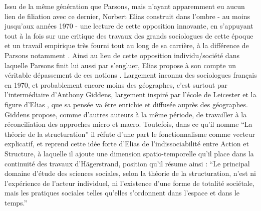 
Issu de la même génération que Parsons, mais n'ayant apparemment eu aucun lien de filiation avec ce dernier, Norbert Elias construit dans l'ombre - au moins jusqu'aux années 1970 - une lecture de cette opposition innovante, en s'appuyant tout à la fois sur une critique des travaux des grands sociologues de cette époque et un travail empirique très fourni tout au long de sa carrière, à la différence de Parsons notamment \autocite{Mennell1989}. Ainsi au lieu de cette opposition individu/société dans laquelle Parsons finit lui aussi par s'engluer, Elias propose à son compte un véritable dépassement de ces notions \autocite[94-101]{Heinich2002}. Largement inconnu des sociologues français en 1970, et probablement encore moins des géographes, c'est surtout par l'intermédiaire d'Anthony Giddens, largement inspiré par l'école de Leicester et la figure d'Elias \autocite[172-178]{Dunning2013}, que sa pensée va être enrichie et diffusée auprès des géographes. Giddens propose, comme d'autres auteurs à la même période, de travailler à la réconciliation des approches micro et macro. Toutefois, dans ce qu'il nomme \enquote{La théorie de la structuration} il réfute d'une part le fonctionnalisme comme vecteur explicatif, et reprend cette idée forte d'Elias de l'indissociabilité entre Action et Structure, à laquelle il ajoute une dimension spatio-temporelle qu'il place dans la continuité des travaux d'Hägerstrand, position qu'il résume ainsi : \enquote{Le principal domaine d’étude des sciences sociales, selon la théorie de la structuration, n’est ni l’expérience de l’acteur individuel, ni l’existence d’une forme de totalité sociétale, mais les pratiques sociales telles qu’elles s’ordonnent dans l’espace et dans le temps.} \autocite[2]{Giddens1984, Giddens1987}

